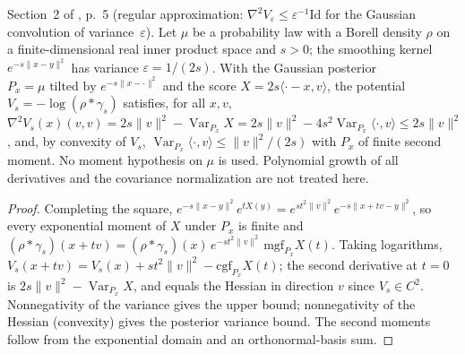 \begin{lemma}
  \label{lem:bkl-gaussian-hessian-upper}
  \leanok
  Section~2 of \cite{BizeulKlartagLehec2026}, p.~5 (regular approximation: $\nabla^2V_\varepsilon\le\varepsilon^{-1}\mathrm{Id}$
  for the Gaussian convolution of variance~$\varepsilon$). Let $\mu$ be a probability law with a
  Borell density $\rho$ on a finite-dimensional real inner product space and $s>0$; the smoothing
  kernel $e^{-s\|x-y\|^2}$ has variance $\varepsilon=1/(2s)$. With the Gaussian posterior
  $P_x=\mu\text{ tilted by }e^{-s\|x-\cdot\|^2}$ and the score $X=2s\langle\cdot-x,v\rangle$, the
  potential $V_s=-\log(\rho*\gamma_s)$ satisfies, for all $x,v$,
  $\nabla^2V_s(x)(v,v)=2s\|v\|^2-\operatorname{Var}_{P_x}X=2s\|v\|^2-4s^2\operatorname{Var}_{P_x}\langle\cdot,v\rangle\le2s\|v\|^2$,
  and, by convexity of $V_s$, $\operatorname{Var}_{P_x}\langle\cdot,v\rangle\le\|v\|^2/(2s)$ with $P_x$
  of finite second moment. No moment hypothesis on $\mu$ is used. Polynomial growth of all
  derivatives and the covariance normalization are not treated here.
\end{lemma}
\begin{proof}
  \leanok
  Completing the square, $e^{-s\|x-y\|^2}e^{tX(y)}=e^{st^2\|v\|^2}e^{-s\|x+tv-y\|^2}$, so every
  exponential moment of $X$ under $P_x$ is finite and $(\rho*\gamma_s)(x+tv)=(\rho*\gamma_s)(x)\,e^{-st^2\|v\|^2}\,\mathrm{mgf}_{P_x}X(t)$.
  Taking logarithms, $V_s(x+tv)=V_s(x)+st^2\|v\|^2-\mathrm{cgf}_{P_x}X(t)$; the second derivative at
  $t=0$ is $2s\|v\|^2-\operatorname{Var}_{P_x}X$, and equals the Hessian in direction $v$ since
  $V_s\in C^2$. Nonnegativity of the variance gives the upper bound; nonnegativity of the Hessian
  (convexity) gives the posterior variance bound. The second moments follow from the exponential
  domain and an orthonormal-basis sum.
\end{proof}

